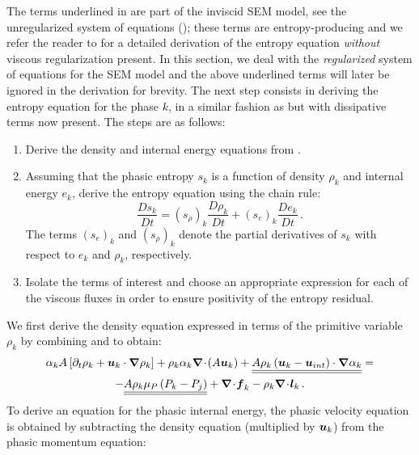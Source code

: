%
The terms underlined in  are part of the inviscid SEM model, see the unregularized system of equations 
(); these terms are entropy-producing and we refer the reader to  for a 
detailed derivation of the  entropy equation \emph{without} viscous regularization present. 
In this section, we deal with the \emph{regularized} system of equations for the SEM model and 
the above underlined terms will later be ignored in the derivation for brevity. 
%
The next step consists in deriving the entropy equation for the phase $k$, in a similar fashion as  but 
with dissipative terms now present. The steps are as follows:
%
\begin{enumerate}
\item Derive the density and internal energy equations from .
\item Assuming that the phasic entropy $s_k$ is a function of density $\rho_k$ and internal energy $e_k$, derive the entropy equation using the chain rule:
\begin{equation}
\label{eq:chain_rule-sct4}
\frac{Ds_k}{Dt} = \left( s_{\rho} \right)_k \frac{D \rho_k}{Dt} + \left( s_{e} \right)_k \frac{D e_k}{Dt} \,.
\end{equation}
The terms $(s_e)_k$ and $(s_{\rho})_k$ denote the partial derivatives of $s_k$ with respect to $e_k$ and $\rho_k$, respectively.
\item Isolate the terms of interest and choose an appropriate expression for each of the viscous fluxes in order to ensure positivity of the entropy residual.
\end{enumerate}
%
We first derive the density equation expressed in terms of the primitive variable $\rho_k$ by combining  and  to obtain:
%
\begin{multline}\label{eq:rho-7-eqn-model-sect4}
\alpha_k A \left[ \partial_t \rho_k + \boldsymbol u_k  \cdot \boldsymbol\nabla \rho_k \right] 
+ \rho_k \alpha_k \boldsymbol\nabla\! \cdot \! (A \boldsymbol u_k ) 
+  \underline{\underline{ A \rho_k \left( \boldsymbol u_k - \boldsymbol u_{int} \right) \cdot \boldsymbol\nabla \alpha_k}} = \\-\underline{\underline{A \rho_k \mu_P \left( P_k - P_j \right)}} + \boldsymbol\nabla\! \cdot \! \boldsymbol f_k - \rho_k \boldsymbol\nabla\! \cdot \! \boldsymbol l_k \,.
\end{multline}
%
To derive an equation for the phasic internal energy, the phasic velocity equation is obtained by subtracting the density equation (multiplied by $\boldsymbol u_k$) from the phasic momentum equation:
